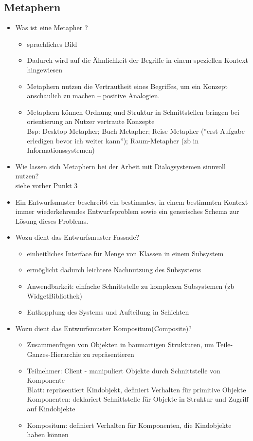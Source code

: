 \subsection{Metaphern}
\begin{itemize}
	\item Was ist eine Metapher ?
	\begin{itemize}
		\item sprachliches Bild
		\item Dadurch wird auf die Ähnlichkeit der Begriffe in einem speziellen Kontext hingewiesen
		\item Metaphern nutzen die Vertrautheit eines Begriffes, um ein Konzept	anschaulich zu machen – positive Analogien.
		\item Metaphern können Ordnung und Struktur in Schnittstellen bringen bei orientierung an Nutzer vertraute Konzepte \\
		Bsp: Desktop-Metapher; Buch-Metapher; Reise-Metapher (''erst Aufgabe erledigen bevor ich weiter kann''); Raum-Metapher (zb in Informationssystemen)
	\end{itemize}
	
	\item Wie lassen sich Metaphern bei der Arbeit mit Dialogsystemen sinnvoll nutzen?\\
	siehe vorher Punkt 3
	
	\item Ein Entwurfsmuster beschreibt ein bestimmtes, in einem
	bestimmten Kontext immer wiederkehrendes Entwurfsproblem
	sowie ein generisches Schema zur Lösung dieses Problems.
	
	\item Wozu dient das Entwurfsmuster Fassade?
	\begin{itemize}
		\item einheitliches Interface für Menge von Klassen in einem Subsystem 
		\item ermöglicht dadurch leichtere Nachnutzung des Subsystems
		\item Anwendbarkeit: einfache Schnittstelle zu komplexen Subsystemen (zb WidgetBibliothek)
		\item Entkopplung des Systems und Aufteilung in Schichten
	\end{itemize}
	
	\item Wozu dient das Entwurfsmuster Kompositum(Composite)?
	\begin{itemize}
		\item Zusammenfügen von Objekten in baumartigen Strukturen, um Teile-Ganzes-Hierarchie zu repräsentieren
		\item Teilnehmer: Client - manipuliert Objekte durch Schnittstelle von Komponente\\
		Blatt: repräsentiert Kindobjekt, definiert Verhalten für primitive Objekte\\
		Komponenten: deklariert Schnittstelle für Objekte in Struktur und Zugriff auf Kindobjekte
		\item Kompositum: definiert Verhalten für Komponenten, die Kindobjekte haben können
	\end{itemize}


\end{itemize}
